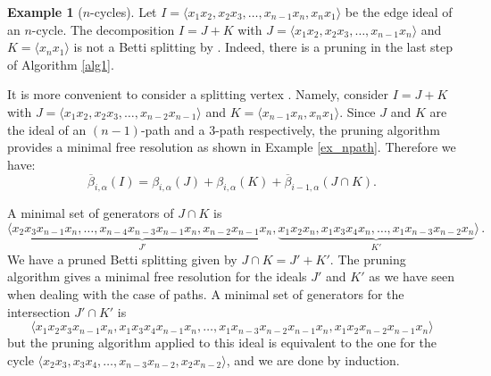 \documentclass[12pt]{amsart}
\theoremstyle{definition}
\newtheorem{example}[theorem]{Example}
\theoremstyle{remark}
\numberwithin{equation}{section}
\begin{document}
\begin{example}[$n$-cycles]
Let $I= \langle x_1x_2,x_2x_3,\dots,x_{n-1}x_n,x_nx_1 \rangle$ be the edge ideal of
an $n$-cycle. The decomposition $I=J+K$ with $J= \langle
x_1x_2,x_2x_3,\dots,x_{n-1}x_{n} \rangle$ and $K=\langle x_{n}x_1
\rangle$ is not a Betti splitting by \cite[Theorem 3.4]{FHV}.
Indeed, there is a pruning in the last step of Algorithm \ref{alg1}.



\vskip 2mm

It is more convenient to consider a splitting vertex . Namely,
consider $I=J+K$ with $J= \langle x_1x_2,x_2x_3,\dots,x_{n-2}x_{n-1}
\rangle$ and $K=\langle x_{n-1}x_{n}, x_{n}x_1 \rangle$. Since $J$ and $K$
are the ideal of an $(n-1)$-path and a $3$-path respectively, the pruning algorithm provides a
minimal free resolution as shown in Example \ref{ex_npath}. Therefore we have:
$$\overline{\beta}_{i,\alpha}(I)= {\beta}_{i,\alpha}(J)+{\beta}_{i,\alpha}(K)+\overline{\beta}_{i-1,\alpha}(J\cap
K).$$


\vskip 2mm
A minimal set of generators of $J\cap K$ is
$$\langle \underbrace{x_2x_3x_{n-1}x_{n},\dots,x_{n-4}x_{n-3}x_{n-1}x_{n},
x_{n-2}x_{n-1}x_{n}}_{J'}, \underbrace{
x_1x_2x_{n},x_1x_3x_{4}x_{n},\dots,x_{1}x_{n-3}x_{n-2}x_{n}}_{K'}
\rangle\,.$$
We have a pruned Betti splitting given by $J\cap K= J' + K'$. The
pruning algorithm gives a minimal free resolution for the ideals
$J'$ and $K'$ as we have seen when dealing with the case of paths. A
minimal set of generators for the intersection $J'\cap K'$ is
$$\langle x_1x_2x_3x_{n-1}x_n,x_1x_3x_{4}x_{n-1}x_n, \dots ,
x_1x_{n-3}x_{n-2}x_{n-1}x_n,x_{1}x_2x_{n-2}x_{n-1}x_n \rangle$$ but
the pruning algorithm applied to this ideal is equivalent to the one
for the cycle $\langle x_2x_3,x_3x_{4}, \dots ,
x_{n-3}x_{n-2},x_2x_{n-2} \rangle$, and we are done by induction.
\end{example}




\vskip 3mm
\end{document}
